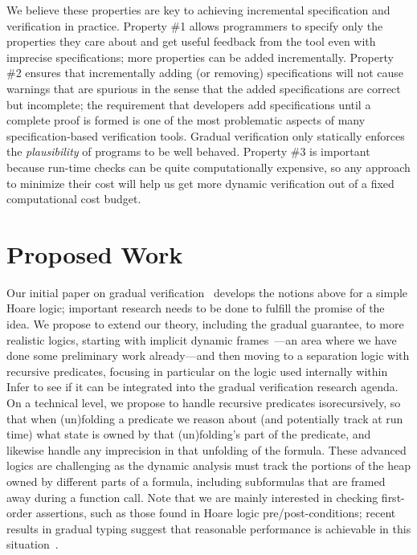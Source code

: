 \documentclass[10pt,twocolumn]{article}
\begin{document}
\begin{sloppypar}
\begin{enumerate}[leftmargin=1em]
\end{enumerate}

We believe these properties are key to achieving incremental specification and verification in practice.  Property \#1 allows programmers to specify only the properties they care about and get useful feedback from the tool even with imprecise specifications; more properties can be added incrementally.  Property \#2 ensures that incrementally adding (or removing) specifications will not cause warnings that are spurious in the sense that the added specifications are correct but incomplete; the requirement that developers add specifications until a complete proof is formed is one of the most problematic aspects of many specification-based verification tools. Gradual verification only statically enforces the {\em plausibility} of programs to be well behaved. Property \#3 is important because run-time checks can be quite computationally expensive, so any approach to minimize their cost will help us get more dynamic verification out of a fixed computational cost budget.


\section{Proposed Work}
\vspace{-2ex}

Our initial paper on gradual verification~\cite{baderAl:vmcai2018} develops the notions above for a simple Hoare logic; important research needs to be done to fulfill the promise of the idea.
We propose to extend our theory, including the gradual guarantee, to more realistic logics, starting with implicit dynamic frames~\cite{smansAl:toplas2012}---an area where we have done some preliminary work already---and then moving to a separation logic with recursive predicates, focusing in particular on the logic used internally within Infer to see if it can be integrated into the gradual verification research agenda.
On a technical level, we propose to handle recursive predicates isorecursively, so that when (un)folding a predicate we reason about (and potentially track at run time) what state is owned by that (un)folding's part of the predicate, and likewise handle any imprecision in that unfolding of the formula.
These advanced logics are challenging as the dynamic analysis must track the portions of the heap owned by different parts of a formula, including subformulas that are framed away during a function call.
Note that we are mainly interested in checking first-order assertions, such as those found in Hoare logic pre/post-conditions; recent results in gradual typing suggest that reasonable performance is achievable in this situation~\cite{muehlboeckTate:oopsla2017}.


\end{sloppypar}
\end{document}
